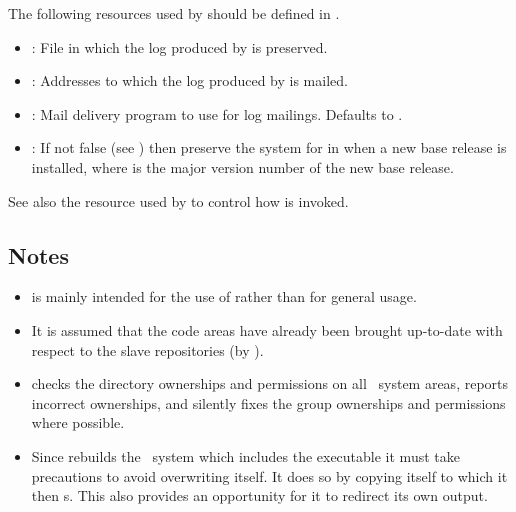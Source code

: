 \noindent
The following resources used by  should be defined in
.

\begin{itemize}
\item
   : File in which the log produced by
    is preserved.

\item
   : Addresses to which the log produced
   by  is mailed.

\item
   : Mail delivery program to use
for log mailings.  Defaults to .

\item
   : If not false (see ) then
   preserve the system for  in 
   when a new base release is installed, where  is the major version
   number of the new base release.
\end{itemize}

See also the  resource used by  to
control how  is invoked.

\subsection*{Notes}

\begin{itemize}
\item
    is mainly intended for the use of  rather than
   for general usage.

\item
   It is assumed that the code areas have already been brought up-to-date with
   respect to the slave repositories (by ).

\item
    checks the directory ownerships and permissions on all
   \aipspp\ system areas, reports incorrect ownerships, and silently fixes the
   group ownerships and permissions where possible.

\item
   Since  rebuilds the \aipspp\ system which includes the
    executable it must take precautions to avoid overwriting
   itself.  It does so by copying itself to  which it then
   s.  This also provides an opportunity for it to redirect its
   own output.
\end{itemize}


